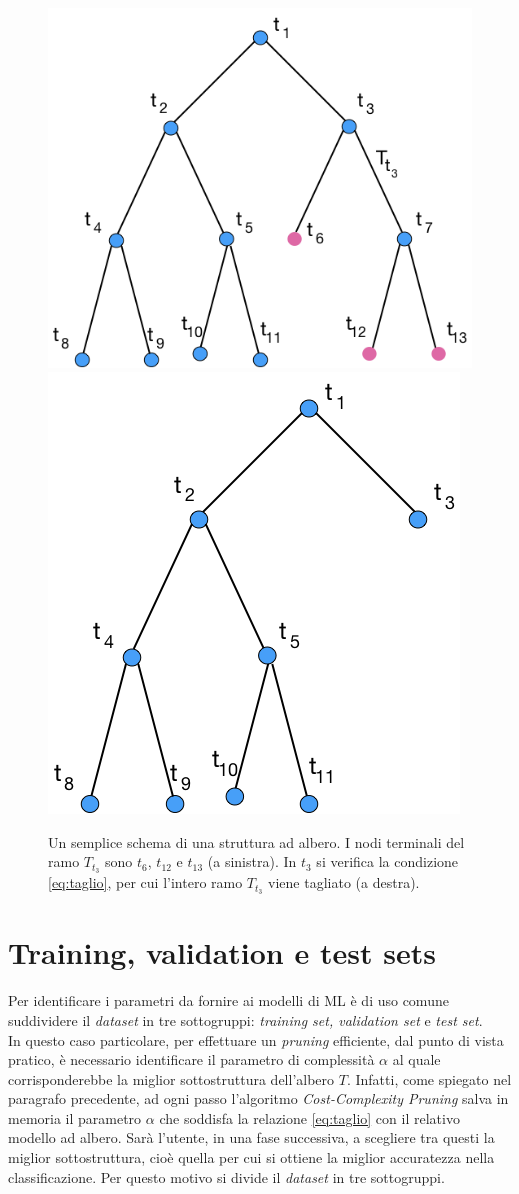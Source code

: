 \begin{figure}
\begin{center}
\includegraphics[width=0.37\columnwidth]{images/albero1.png}
\includegraphics[width=0.30\columnwidth]{images/albero2.png}
\end{center}
\caption{Un semplice schema di una struttura ad albero. I nodi terminali del ramo $T_{t_{3}}$ sono $t_{6}$, $t_{12}$ e $t_{13}$ (a sinistra). In $t_{3}$ si verifica la condizione \ref{eq:taglio}, per cui l'intero ramo $T_{t_{3}}$ viene tagliato (a destra).}
\label{fig:potatura}
\end{figure}


\section{Training, validation e test sets}
\label{sec:splitdata}
Per identificare i parametri da fornire ai modelli di ML è di uso comune suddividere il \textit{dataset} in tre sottogruppi: \textit{training set, validation set} e \textit{test set}.\\
In questo caso particolare, per effettuare un \textit{pruning} efficiente, dal punto di vista pratico, è necessario identificare il parametro di complessità $\alpha$ al quale corrisponderebbe la miglior sottostruttura dell'albero $T$. Infatti, come spiegato nel paragrafo precedente, ad ogni passo l'algoritmo \textit{Cost-Complexity Pruning} salva in memoria il parametro $\alpha$ che soddisfa la relazione \ref{eq:taglio} con il relativo modello ad albero. Sarà l'utente, in una fase successiva, a scegliere tra questi la miglior sottostruttura, cioè quella per cui si ottiene la miglior accuratezza nella classificazione. Per questo motivo si divide il \textit{dataset} in tre sottogruppi.

